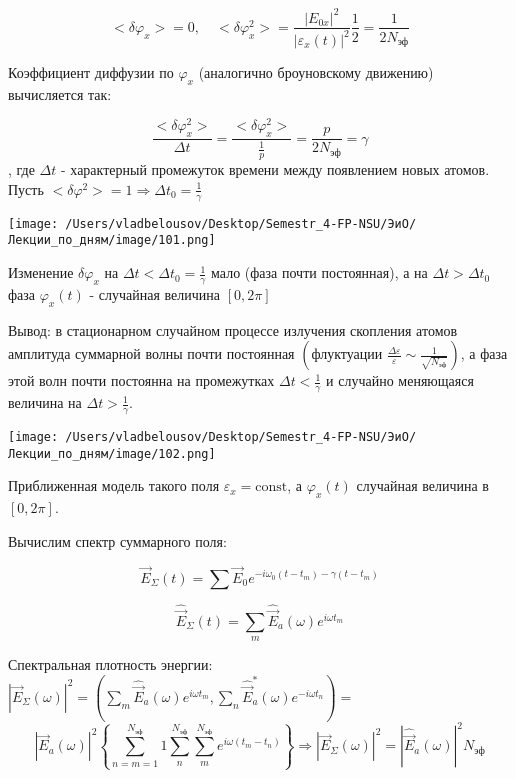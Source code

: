 \documentclass[12pt, a4paper]{report}
\begin{document}
\[ <\delta \varphi_x > = 0 , \quad  <\delta \varphi _ x ^2 > = \frac{|E_{0x } | ^2 }{|\varepsilon_x (t )| ^2 } \frac{1}{2 } = \frac{1}{2 N_{\text{эф} } }    \] 

Коэффициент диффузии по \( \varphi_x \) (аналогично броуновскому движению) вычисляется так: 

\[ \frac{<\delta \varphi_ x  ^2 >}{\Delta t } = \frac{<\delta \varphi _x ^2 >}{\frac{1 }{p } } = \frac{p}{2N_{\text{эф} } } =   \gamma  \] 
, где \( \Delta t \) - характерный промежуток времени между появлением новых атомов. Пусть \( \displaystyle <\delta \varphi ^2 > = 1 \Rightarrow \Delta t_0 = \frac{1}{\gamma}  \) 

\begin{center}
    \texttt{[image: /Users/vladbelousov/Desktop/Semestr\_4-FP-NSU/ЭиО/Лекции\_по\_дням/image/101.png]}
\end{center} 

Изменение \( \delta \varphi_x  \) на  \( \Delta t < \Delta t_0 = \frac{1}{\gamma }   \) мало (фаза почти постоянная), а на \( \Delta t  > \Delta t_0  \) фаза \( \varphi _x (t )  \) - случайная величина \( [0, 2\pi ] \)  

Вывод: в стационарном случайном процессе излучения скопления атомов амплитуда суммарной волны почти постоянная  \( \left( \text{флуктуации }  \displaystyle  \frac{\Delta \varepsilon }{\varepsilon }\sim \frac{1}{\sqrt{N_{\text{эф} } }} \right)   \), а фаза этой волн почти постоянна на промежутках \( \displaystyle  \Delta t < \frac{1}{\gamma }  \) и случайно меняющаяся величина на \( \displaystyle  \Delta t > \frac{1}{\gamma }  \). 

\begin{center}
    \texttt{[image: /Users/vladbelousov/Desktop/Semestr\_4-FP-NSU/ЭиО/Лекции\_по\_дням/image/102.png]}
\end{center} 

Приближенная модель такого поля  \( \varepsilon _x = \mathrm{const }   \), а \( \varphi _ x (t )  \)   случайная величина в \( [ 0 ,2 \pi] \).

Вычислим спектр суммарного поля: 

\[ \vec{E } _{\Sigma } (t ) = \sum   \vec{E }  _ 0 e^{ - i \omega_0 (t -t_m )- \gamma(t- t_m)}   \] 

\[ \hat{\vec{E } } _{\Sigma } (t ) = \sum_{m }\hat{\vec{E }}   _ a(\omega ) e^{i \omega t_m}     \] 

Спектральная плотность энергии: \(  \displaystyle  |\vec{E } _{\Sigma } ( \omega ) | ^2 = \left( \sum_{m }\hat{\vec{E } }_a (\omega ) e^{i \omega t_m } , \sum_{n}\hat{\vec{E } }_a ^{*} (\omega ) e^{-i \omega t_n }   \right) = \) 
\[ |\vec{E } _a ( \omega)    | ^2 \left\{  \sum_{n =m  =1 } ^{N_{\text{эф} } } 1 \sum  ^{N_{\text{эф} }  } _{n }  \sum_{m} ^{N_{\text{эф} } } e^{ i \omega (t_m - t_n)}   \right\}  \Rightarrow |\vec{E }  _{\Sigma } ( \omega ) | ^2  = |\hat{ \vec{E } } _a ( \omega ) | ^2 N_{\text{эф} }\] 
\end{document}

